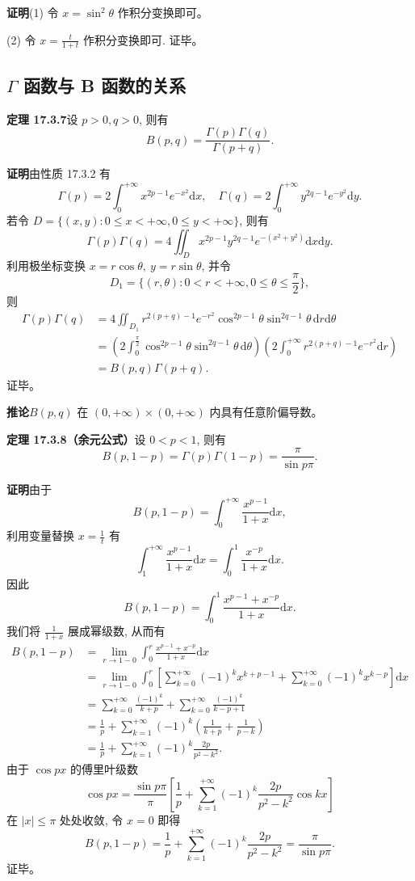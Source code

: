 \documentclass[UTF8,12pt,a4paper,fontset=fandol]{ctexart}
\begin{document}
\noindent\textbf{证明}\quad (1) 令 $x=\sin^2\theta$ 作积分变换即可。

(2) 令 $x=\frac{t}{1+t}$ 作积分变换即可. 证毕。

\subsection{$\Gamma$ 函数与 B 函数的关系}

\noindent\textbf{定理 17.3.7}\quad 设 $p>0,q>0$, 则有
\[
  B(p,q)=\frac{\Gamma(p)\Gamma(q)}{\Gamma(p+q)}.
\]

\noindent\textbf{证明}\quad 由性质 17.3.2 有
\[
  \Gamma(p)=2\int_0^{+\infty}x^{2p-1}e^{-x^2}\mathrm dx,\quad
  \Gamma(q)=2\int_0^{+\infty}y^{2q-1}e^{-y^2}\mathrm dy.
\]
若令 $D=\{(x,y):0\leqslant x<+\infty,0\leqslant y<+\infty\}$, 则有
\[
  \Gamma(p)\Gamma(q)
  =4\iint_D x^{2p-1}y^{2q-1}e^{-(x^2+y^2)}\mathrm dx\mathrm dy.
\]
利用极坐标变换 $x=r\cos\theta,\ y=r\sin\theta$, 并令
\[
  D_1=\{(r,\theta):0<r<+\infty,0\leqslant\theta\leqslant\frac\pi2\},
\]
则
\[
\begin{aligned}
  \Gamma(p)\Gamma(q)
  &=4\iint_{D_1}r^{2(p+q)-1}e^{-r^2}
    \cos^{2p-1}\theta\sin^{2q-1}\theta\,\mathrm dr\mathrm d\theta\\
  &=
  \left(2\int_0^{\frac\pi2}\cos^{2p-1}\theta\sin^{2q-1}\theta\,\mathrm d\theta\right)
  \left(2\int_0^{+\infty}r^{2(p+q)-1}e^{-r^2}\mathrm dr\right)\\
  &=B(p,q)\Gamma(p+q).
\end{aligned}
\]
证毕。

\noindent\textbf{推论}\quad $B(p,q)$ 在 $(0,+\infty)\times(0,+\infty)$ 内具有任意阶偏导数。

\noindent\textbf{定理 17.3.8（余元公式）}\quad 设 $0<p<1$, 则有
\[
  B(p,1-p)=\Gamma(p)\Gamma(1-p)=\frac{\pi}{\sin p\pi}.
\]

\noindent\textbf{证明}\quad 由于
\[
  B(p,1-p)=\int_0^{+\infty}\frac{x^{p-1}}{1+x}\mathrm dx,
\]
利用变量替换 $x=\frac1t$ 有
\[
  \int_1^{+\infty}\frac{x^{p-1}}{1+x}\mathrm dx
  =\int_0^1\frac{x^{-p}}{1+x}\mathrm dx.
\]
因此
\[
  B(p,1-p)=\int_0^1\frac{x^{p-1}+x^{-p}}{1+x}\mathrm dx.
\]
我们将 $\frac1{1+x}$ 展成幂级数, 从而有
\[
\begin{aligned}
  B(p,1-p)
  &=\lim_{r\to1-0}\int_0^r\frac{x^{p-1}+x^{-p}}{1+x}\mathrm dx\\
  &=\lim_{r\to1-0}\int_0^r
  \left[\sum_{k=0}^{+\infty}(-1)^k x^{k+p-1}
  +\sum_{k=0}^{+\infty}(-1)^k x^{k-p}\right]\mathrm dx\\
  &=\sum_{k=0}^{+\infty}\frac{(-1)^k}{k+p}
  +\sum_{k=0}^{+\infty}\frac{(-1)^k}{k-p+1}\\
  &=\frac1p+\sum_{k=1}^{+\infty}(-1)^k
  \left(\frac1{k+p}+\frac1{p-k}\right)\\
  &=\frac1p+\sum_{k=1}^{+\infty}(-1)^k\frac{2p}{p^2-k^2}.
\end{aligned}
\]
由于 $\cos px$ 的傅里叶级数
\[
  \cos px=\frac{\sin p\pi}{\pi}
  \left[\frac1p+\sum_{k=1}^{+\infty}(-1)^k\frac{2p}{p^2-k^2}\cos kx\right]
\]
在 $|x|\leqslant\pi$ 处处收敛, 令 $x=0$ 即得
\[
  B(p,1-p)=\frac1p+\sum_{k=1}^{+\infty}(-1)^k\frac{2p}{p^2-k^2}
  =\frac{\pi}{\sin p\pi}.
\]
证毕。
\end{document}
